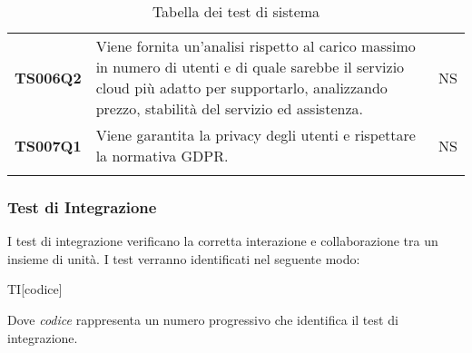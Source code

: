 \documentclass[../piano-di-qualifica.tex]{subfiles}
\begin{document}
\begin{centering}
\begin{longtable}[H]{>{\centering\bfseries}m{3cm} >{}p{10cm} >{\centering\arraybackslash}m{3cm}}
    TS006Q2            & Viene fornita un’analisi rispetto al carico massimo in numero di utenti e di quale sarebbe il servizio cloud più adatto per supportarlo, analizzando prezzo, stabilità del servizio ed assistenza. \newline
                       & NS                                                                                                                                                                                                                                                               \\

    TS007Q1            & Viene garantita la privacy degli utenti e rispettare la normativa GDPR\@. \newline
                       & NS                                                                                                                                                                                                                                                               \\

    \rowcolor{white}
    \caption{Tabella dei test di sistema}%
    \label{tab:test_sistema}
  \end{longtable}
\end{centering}

\subsubsection{Test di Integrazione}%
\label{subs:test_di_integrazione}

I test di integrazione verificano la corretta interazione e collaborazione tra un insieme di unità. I test verranno identificati nel seguente modo:
\begin{center}
  TI[codice]
\end{center}

Dove \textit{codice} rappresenta un numero progressivo che identifica il test di integrazione.
\end{document}
